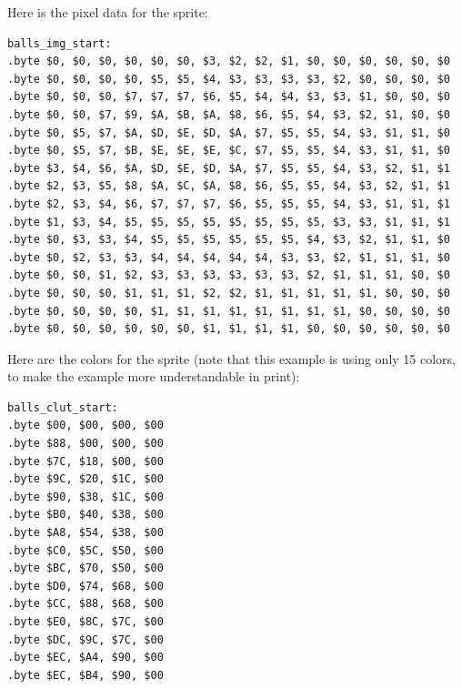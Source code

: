 Here is the pixel data for the sprite:
\begin{verbatim}
balls_img_start:
.byte $0, $0, $0, $0, $0, $0, $3, $2, $2, $1, $0, $0, $0, $0, $0, $0
.byte $0, $0, $0, $0, $5, $5, $4, $3, $3, $3, $3, $2, $0, $0, $0, $0
.byte $0, $0, $0, $7, $7, $7, $6, $5, $4, $4, $3, $3, $1, $0, $0, $0
.byte $0, $0, $7, $9, $A, $B, $A, $8, $6, $5, $4, $3, $2, $1, $0, $0
.byte $0, $5, $7, $A, $D, $E, $D, $A, $7, $5, $5, $4, $3, $1, $1, $0
.byte $0, $5, $7, $B, $E, $E, $E, $C, $7, $5, $5, $4, $3, $1, $1, $0
.byte $3, $4, $6, $A, $D, $E, $D, $A, $7, $5, $5, $4, $3, $2, $1, $1
.byte $2, $3, $5, $8, $A, $C, $A, $8, $6, $5, $5, $4, $3, $2, $1, $1
.byte $2, $3, $4, $6, $7, $7, $7, $6, $5, $5, $5, $4, $3, $1, $1, $1
.byte $1, $3, $4, $5, $5, $5, $5, $5, $5, $5, $5, $3, $3, $1, $1, $1
.byte $0, $3, $3, $4, $5, $5, $5, $5, $5, $5, $4, $3, $2, $1, $1, $0
.byte $0, $2, $3, $3, $4, $4, $4, $4, $4, $3, $3, $2, $1, $1, $1, $0
.byte $0, $0, $1, $2, $3, $3, $3, $3, $3, $3, $2, $1, $1, $1, $0, $0
.byte $0, $0, $0, $1, $1, $1, $2, $2, $1, $1, $1, $1, $1, $0, $0, $0
.byte $0, $0, $0, $0, $1, $1, $1, $1, $1, $1, $1, $1, $0, $0, $0, $0
.byte $0, $0, $0, $0, $0, $0, $1, $1, $1, $1, $0, $0, $0, $0, $0, $0
\end{verbatim}

Here are the colors for the sprite (note that this example is using only 15 colors, to make the example more understandable in print):
\begin{verbatim}
balls_clut_start:
.byte $00, $00, $00, $00
.byte $88, $00, $00, $00
.byte $7C, $18, $00, $00
.byte $9C, $20, $1C, $00
.byte $90, $38, $1C, $00
.byte $B0, $40, $38, $00
.byte $A8, $54, $38, $00
.byte $C0, $5C, $50, $00
.byte $BC, $70, $50, $00
.byte $D0, $74, $68, $00
.byte $CC, $88, $68, $00
.byte $E0, $8C, $7C, $00
.byte $DC, $9C, $7C, $00
.byte $EC, $A4, $90, $00
.byte $EC, $B4, $90, $00
\end{verbatim}
